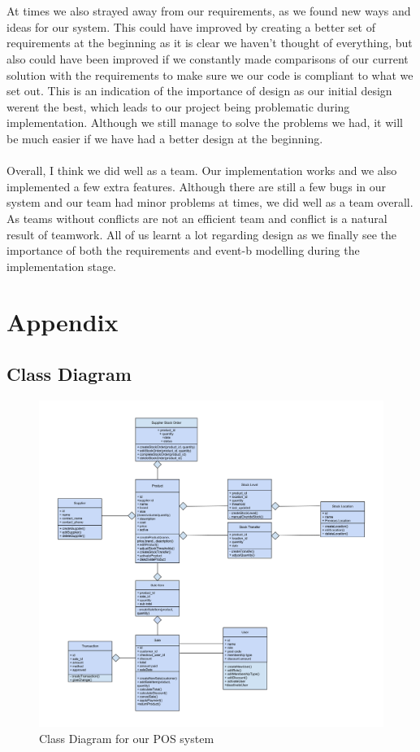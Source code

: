 \documentclass[a4paper]{article}
\begin{document}
\\\\
At times we also strayed away from our requirements, as we found new ways and ideas for our system. This could have improved by creating a better set of requirements at the beginning as it is clear we haven't thought of everything, but also could have been improved if we constantly made comparisons of our current solution with the requirements to make sure we our code is compliant to what we set out. This is an indication of the importance of design as our initial design werent the best, which leads to our project being problematic during implementation. Although we still manage to solve the problems we had, it will be much easier if we have had a better design at the beginning. 
\\\\
Overall, I think we did well as a team. Our implementation works and we also implemented a few extra features. Although there are still a few bugs in our system and our team had minor problems at times, we did well as a team overall. As teams without conflicts are not an efficient team and conflict is a natural result of teamwork.  All of us learnt a lot regarding design as we finally see the importance of both the requirements and event-b modelling during the implementation stage. 
\pagebreak


\section{Appendix}

\subsection{Class Diagram}

\begin{figure}[h]
\centering
  \includegraphics[scale=0.2]{Class diagram.png}
	\caption{Class Diagram for our POS system}
\end{figure}
\end{document}
